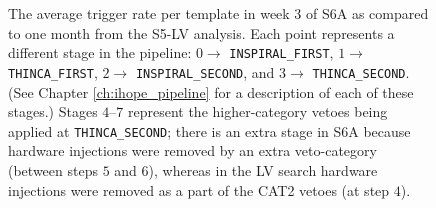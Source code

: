 \begin{figure}[p]
\center
{}
\label{fig:avg_rate_per_tmplt}
\caption{The average trigger rate per template in week 3 of S6A as compared to
one month from the S5-LV analysis. Each point represents a different stage in
the pipeline: $0 \rightarrow$ \texttt{INSPIRAL\_FIRST}, $1 \rightarrow$
\texttt{THINCA\_FIRST}, $2 \rightarrow$ \texttt{INSPIRAL\_SECOND}, and $3
\rightarrow$ \texttt{THINCA\_SECOND}. (See Chapter \ref{ch:ihope_pipeline} for
a description of each of these stages.) Stages $4$--$7$ represent the
higher-category vetoes being applied at \texttt{THINCA\_SECOND}; there is an
extra stage in S6A because hardware injections were removed by an extra
veto-category (between steps $5$ and $6$), whereas in the LV search hardware
injections were removed as a part of the CAT2 vetoes (at step $4$).}
\end{figure}

